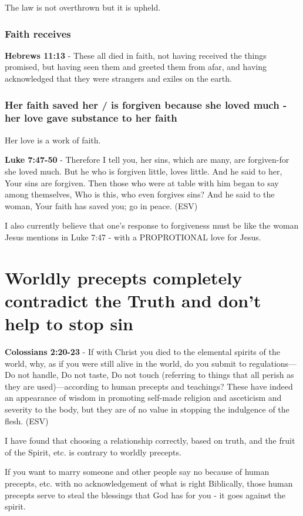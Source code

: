 \documentclass[11pt]{article}
\begin{document}
The law is not overthrown but it is upheld.

\subsubsection{Faith receives}
\label{sec:orgfc19b67}
\textbf{Hebrews 11:13} - These all died in faith, not having received the things promised, but having seen them and greeted them from afar, and having acknowledged that they were strangers and exiles on the earth.

\subsubsection{Her faith saved her / is forgiven because she loved much - her love gave substance to her faith}
\label{sec:org626d2d2}
Her love is a work of faith.

\textbf{Luke 7:47-50} -  Therefore I tell you, her sins, which are many, are forgiven-for she loved much.  But he who is forgiven little, loves little.  And he said to her, Your sins are forgiven.  Then those who were at table with him began to say among themselves, Who is this, who even forgives sins?  And he said to the woman, Your faith has saved you; go in peace.  (ESV)

I also currently believe that one's response to forgiveness must be like the woman Jesus mentions in Luke 7:47 - with a PROPROTIONAL love for Jesus.

\section{Worldly precepts completely contradict the Truth and don't help to stop sin}
\label{sec:org4e08f00}
\textbf{Colossians 2:20-23} - If with Christ you died to the elemental spirits of the world, why, as if you were still alive in the world, do you submit to regulations— Do not handle, Do not taste, Do not touch (referring to things that all perish as they are used)—according to human precepts and teachings?  These have indeed an appearance of wisdom in promoting self-made religion and asceticism and severity to the body, but they are of no value in stopping the indulgence of the flesh.  (ESV)

I have found that choosing a relationship correctly, based on truth, and the fruit of the Spirit, etc. is contrary to worldly precepts.

If you want to marry someone and other people say no because of human precepts, etc. with no acknowledgement of what is right Biblically,
those human precepts serve to steal the blessings that God has for you - it goes against the spirit.
\end{document}
